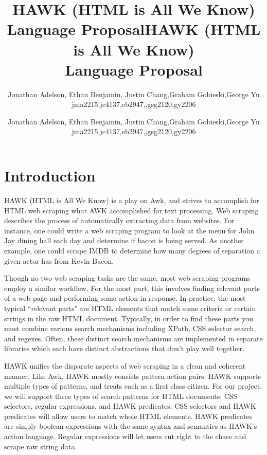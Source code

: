 \documentclass[12pt]{article}
\title{HAWK (HTML is All We Know)\\
Language Proposal}
\author{Jonathan Adelson, Ethan Benjamin, Justin Chang,Graham Gobieski,George Yu\\
jma2215,jc4137,eb2947,,gsg2120,gy2206}
\date{}
\newcommand{\setdocdata}{
\title{HAWK (HTML is All We Know)\\
Language Proposal}
\author{Jonathan Adelson, Ethan Benjamin, Justin Chang,Graham Gobieski,George Yu\\
jma2215,jc4137,eb2947,,gsg2120,gy2206}
\date{}
}
\begin{document}
 

\setdocdata
\maketitle

\section*{Introduction}

	HAWK (HTML is All We Know) is a play on Awk, and strives to accomplish for HTML web scraping what AWK accomplished for text processing. Web scraping describes the process of automatically extracting data from websites. For instance, one could write a web scraping program to look at the menu for John Jay dining hall each day and determine if bacon is being served. As another example, one could scrape IMDB to determine how many degrees of separation a given actor has from Kevin Bacon. 

	Though no two web scraping tasks are the same, most web scraping programs employ a similar workflow. For the most part, this involves finding relevant parts of a web page and performing some action in response. In practice, the most typical ``relevant parts" are HTML elements that match some criteria or certain strings in the raw HTML document. Typically, in order to find these parts you must combine various search mechanisms including XPath, CSS selector search, and regexes. Often, these distinct search mechanisms are implemented in separate libraries which each have distinct abstractions that don't play well together. 

	HAWK unifies the disparate aspects of web scraping in a clean and coherent manner. Like Awk, HAWK mostly consists pattern-action pairs. HAWK supports multiple types of patterns, and treats each as a first class citizen. For our project, we will support three types of search patterns for HTML documents: CSS selectors, regular expressions, and HAWK predicates. CSS selectors and HAWK predicates will allow users to match whole HTML elements. HAWK predicates are simply boolean expressions with the same syntax and semantics as HAWK's action language. Regular expressions will let users cut right to the chase and scrape raw string data. 
\end{document}
